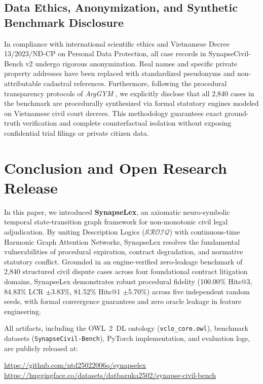 \documentclass[11pt,a4paper]{article}
\begin{document}
\subsection{Data Ethics, Anonymization, and Synthetic Benchmark Disclosure}
\label{sec:ethics_statement}
In compliance with international scientific ethics and Vietnamese Decree 13/2023/NĐ-CP on Personal Data Protection, all case records in SynapseCivil-Bench v2 undergo rigorous anonymization. Real names and specific private property addresses have been replaced with standardized pseudonyms and non-attributable cadastral references. Furthermore, following the procedural transparency protocols of \textit{ArgGYM} \citep{deveci2026arggym}, we explicitly disclose that all 2,840 cases in the benchmark are procedurally synthesized via formal statutory engines modeled on Vietnamese civil court decrees. This methodology guarantees exact ground-truth verification and complete counterfactual isolation without exposing confidential trial filings or private citizen data.

\section{Conclusion and Open Research Release}
\label{sec:conclusion}
In this paper, we introduced \textbf{SynapseLex}, an axiomatic neuro-symbolic temporal state-transition graph framework for non-monotonic civil legal adjudication. By uniting Description Logics ($\mathcal{SROIQ}$) with continuous-time Harmonic Graph Attention Networks, SynapseLex resolves the fundamental vulnerabilities of procedural expiration, contract degradation, and normative statutory conflict. Grounded in an engine-verified zero-leakage benchmark of 2,840 structured civil dispute cases across four foundational contract litigation domains, SynapseLex demonstrates robust procedural fidelity (100.00\% Hits@3, 84.83\% LCR $\pm$3.83\%, 81.52\% Hits@1 $\pm$5.70\%) across five independent random seeds, with formal convergence guarantees and zero oracle leakage in feature engineering.

All artifacts, including the OWL~2~DL ontology (\texttt{vclo\_core.owl}), benchmark datasets (\texttt{SynapseCivil-Bench}), PyTorch implementation, and evaluation logs, are publicly released at:
\begin{center}
\url{https://github.com/ntd25022006q/synapselex} \\
\url{https://huggingface.co/datasets/datbazuka2502/synapse-civil-bench}
\end{center}
\end{document}

